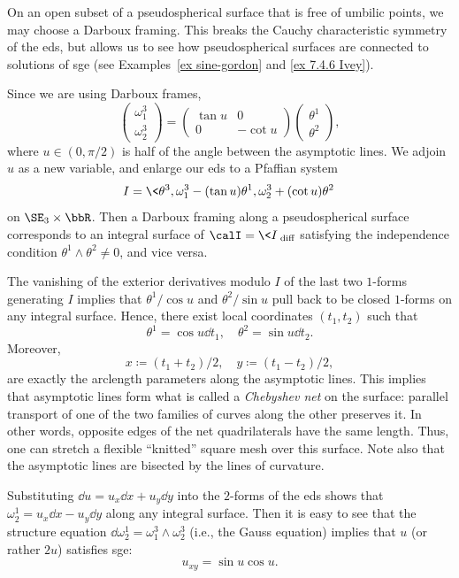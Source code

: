 On an open subset of a pseudospherical surface that is free of umbilic points, we may choose a Darboux framing. This breaks the Cauchy characteristic symmetry of the \gls{eds}, but allows us to see how pseudospherical surfaces are connected to solutions of \gls{sge} (see Examples~\ref{ex sine-gordon} and \ref{ex 7.4.6 Ivey}).

Since we are using Darboux frames,
\[\begin{pmatrix}
    \omega^3_1\\\omega^3_2
\end{pmatrix}=\begin{pmatrix}
    \tan u & 0\\
    0 & -\cot u
\end{pmatrix}\begin{pmatrix}
    \theta^1\\\theta^2
\end{pmatrix},\]
where $u\in (0,\pi/2)$ is half of the angle between the asymptotic lines. We adjoin $u$ as a new variable, and enlarge our \gls{eds} to a Pfaffian system 
\[I=\<\theta^3,\omega^3_1-(\tan u)\theta^1,\omega^3_2+(\cot u)\theta^2\>\]
on $\SE_3\times \bbR$. Then a Darboux framing along a pseudospherical surface corresponds to an integral surface of $\calI=\<I\>_{\mathrm{diff}}$ satisfying the independence condition $\theta^1\wedge\theta^2\neq 0$, and vice versa.

The vanishing of the exterior derivatives modulo $I$ of the last two $1$-forms generating $I$ implies that $\theta^1/\cos u$ and $\theta^2/\sin u$ pull back to be closed $1$-forms on any integral surface. Hence, there exist local coordinates $(t_1,t_2)$ such that 
\[\theta^1=\cos u\dd t_1,\quad \theta^2=\sin u\dd t_2.\]
Moreover, 
\[x\coloneqq (t_1+ t_2)/2,\quad y\coloneqq (t_1-t_2)/2,\] are exactly the arclength parameters along the asymptotic lines. This implies that asymptotic lines form what is called a \emph{Chebyshev net} on the surface: parallel transport of one of the two families of curves along the other preserves it. In other words, opposite edges of the net quadrilaterals have the same length. Thus, one can stretch a flexible ``knitted'' square mesh over this surface. Note also that the asymptotic lines are bisected by the lines of curvature.

Substituting $\dd u=u_x\dd x+u_y\dd y$ into the $2$-forms of the \gls{eds} shows that $\omega_2^1=u_x\dd x-u_y\dd y$ along any integral surface. Then it is easy to see that the structure equation $\dd\omega^1_2=\omega^3_1\wedge\omega^3_2$ (i.e., the Gauss equation) implies that $u$ (or rather $2u$) satisfies \gls{sge}:
\[u_{xy}=\sin u\cos u.\]

